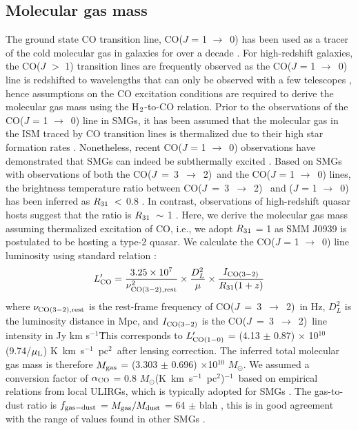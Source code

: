 \documentclass[twocolumn,apj,numberedappendix]{emulateapj}
\newcommand{\Msun}{\mbox{$M_{\odot}$}}
\newcommand{\rarr}{$\rightarrow$}
\newcommand{\CO}{\mbox{CO($J$ = 3 $\rightarrow$ 2) }}
\newcommand{\LpU}{\mbox{K km s$^{-1}$ pc$^2$}}
\newcommand{\eg}{{\sl e.g.,~}}
\newcommand{\pmOne}{$^{-1}$}
\begin{document}
\subsection{Molecular gas mass}
The ground state CO transition line, CO($J$ = 1 \rarr\ 0) has been used as a tracer of the cold molecular gas in galaxies for 
over a decade \citep*[\eg][]{Downes98a,Wilson70a}. For high-redshift galaxies, the CO($J$ $>$ 1) transition lines are frequently observed as
 the CO($J$ = 1 \rarr\ 0) line is redshifted to wavelengths that can only be observed with a few telescopes \citep{Carilli13a}, 
 hence assumptions on the CO excitation conditions are required to derive the molecular gas mass using the H$_{\rm 2}$-to-CO 
 relation. Prior to the observations of the CO($J$ = 1 \rarr\ 0) line in SMGs, it has been assumed that the molecular gas in the
  ISM traced by CO transition lines is thermalized due to their high star formation rates \citep[\eg][]{Greve05a, Coppin08a}.
   Nonetheless, recent CO($J$ = 1 \rarr\ 0) observations have demonstrated that SMGs can indeed be subthermally excited
   \citep{Harris10a,Riechers11c,Riechers11d,Ivison11a}. Based on SMGs with observations of both the \CO and the CO($J$ = 1 \rarr\ 0) lines, the 
   brightness temperature ratio between \CO
and ($J$ = 1 \rarr\ 0) has been inferred as $R_{\rm 31}\ <$ 0.8 \citep
   {Harris10a,Carilli10a,Swinbank2010a,Riechers11d,Ivison11a,Ivison10d}. In contrast, observations of high-redshift quasar hosts suggest that the ratio 
   is $R_{\rm 31}\ \sim\ $1 \citep{Riechers06a, Riechers11a, Scott11a}. 
Here, we derive the molecular gas mass assuming thermalized excitation of CO, i.e., we adopt $R_{\rm 31}$ = 1 as SMM J0939 is 
postulated to be hosting a type-2 quasar. We calculate the CO($J$ = 1 \rarr\ 0) line luminosity using standard relation 
\citep[\eg][]{Solomon05a,Carilli13a}:
\begin{equation}
L^{\prime}_{\rm CO} = \frac{3.25\times10^7}{\nu_{\rm CO (3-2), rest}^2}\times \frac{D_L^2}{\mu} \times
\frac{I_{\rm CO(3-2)}} {R_{\rm 31} (1 + z)}
\end{equation}
where $\nu_{\rm CO (3-2), rest}$ is the rest-frame frequency of \CO in Hz, $D_L^2$ is the luminosity distance in Mpc, and $I_{\rm CO(3-2)}$ is the \CO line intensity in Jy km s\pmOne\. This corresponds to $L^{\prime}_{\rm CO (1-0)}$ = (4.13 $\pm$ 0.87) $\times$ 10$^{10}$ (9.74/$\mu_{\rm L}$) \LpU\ after lensing correction. The inferred total molecular gas mass is therefore $M_{\rm gas}$ = (3.303 $\pm$ 0.696) $\times
$10$^{10}$ \Msun. We assumed a conversion factor of $\alpha_{\rm CO}$ =
0.8 \Msun (\LpU)\pmOne\ based on empirical relations from local ULIRGs, which is typically
adopted for SMGs \citep[\eg][]{Tacconi06a,Tacconi08a,Bothwell13a}. 
The gas-to-dust
ratio is $f_{\rm gas-dust}$ = $M_{\rm gas}/M_{\rm dust}$ = 64 $\pm$ blah , this is in good agreement with the range 
of values found in other SMGs \citep{Coppin08a,Micha10a,Riechers11c}.
\end{document}
